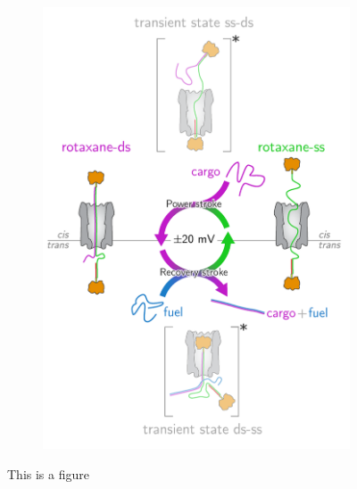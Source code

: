 \begin{figure}[ht!]
\begin{centering}
\begin{subfigure}[t]{\dimexpr.5\linewidth-1.3em\relax}
  \includegraphics[width=\linewidth,valign=t]{Figures/RotaxaneCycle.png}
  \end{subfigure}
  \caption[short lof/lot caption]{This is a figure \newline \newline \newline \newline
  \newline}
  \label{fig:test}
  \end{centering}
\end{figure}

\newpage
